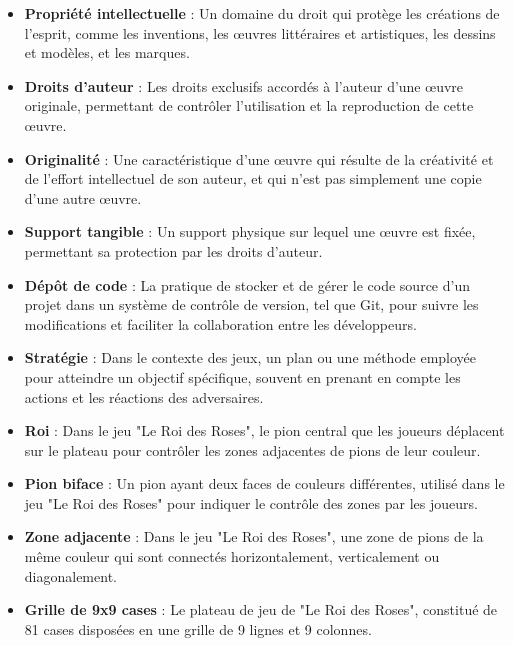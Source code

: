 \begin{itemize}
    \item \textbf{Propriété intellectuelle} : Un domaine du droit qui protège les créations de l'esprit, comme les inventions, les œuvres littéraires et artistiques, les dessins et modèles, et les marques.

    \item \textbf{Droits d'auteur} : Les droits exclusifs accordés à l'auteur d'une œuvre originale, permettant de contrôler l'utilisation et la reproduction de cette œuvre.

    \item \textbf{Originalité} : Une caractéristique d'une œuvre qui résulte de la créativité et de l'effort intellectuel de son auteur, et qui n'est pas simplement une copie d'une autre œuvre.

    \item \textbf{Support tangible} : Un support physique sur lequel une œuvre est fixée, permettant sa protection par les droits d'auteur.

    \item \textbf{Dépôt de code} : La pratique de stocker et de gérer le code source d'un projet dans un système de contrôle de version, tel que Git, pour suivre les modifications et faciliter la collaboration entre les développeurs.

    \item \textbf{Stratégie} : Dans le contexte des jeux, un plan ou une méthode employée pour atteindre un objectif spécifique, souvent en prenant en compte les actions et les réactions des adversaires.

    \item \textbf{Roi} : Dans le jeu "Le Roi des Roses", le pion central que les joueurs déplacent sur le plateau pour contrôler les zones adjacentes de pions de leur couleur.

    \item \textbf{Pion biface} : Un pion ayant deux faces de couleurs différentes, utilisé dans le jeu "Le Roi des Roses" pour indiquer le contrôle des zones par les joueurs.

    \item \textbf{Zone adjacente} : Dans le jeu "Le Roi des Roses", une zone de pions de la même couleur qui sont connectés horizontalement, verticalement ou diagonalement.

    \item \textbf{Grille de 9x9 cases} : Le plateau de jeu de "Le Roi des Roses", constitué de 81 cases disposées en une grille de 9 lignes et 9 colonnes.


\end{itemize}
